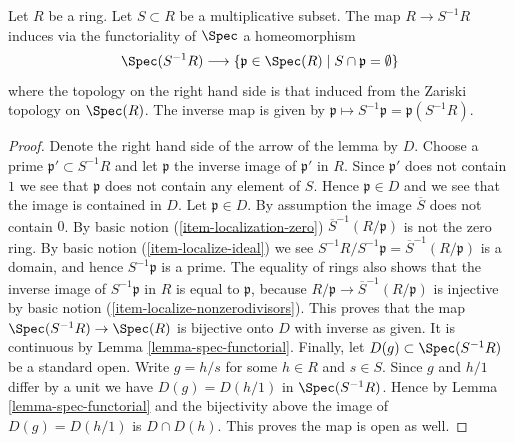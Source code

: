 \begin{lemma}
\label{lemma-spec-localization}
Let $R$ be a ring. Let $S \subset R$ be a multiplicative subset.
The map $R \to S^{-1}R$ induces via the functoriality of $\Spec$
a homeomorphism
$$
\Spec(S^{-1}R)
\longrightarrow
\{\mathfrak p \in \Spec(R) \mid S \cap \mathfrak p = \emptyset \}
$$
where the topology on the right hand side is that induced from the
Zariski topology on $\Spec(R)$. The inverse map is given
by $\mathfrak p \mapsto S^{-1}\mathfrak p = \mathfrak p(S^{-1}R)$.
\end{lemma}

\begin{proof}
Denote the right hand side of the arrow of the lemma by $D$.
Choose a prime $\mathfrak p' \subset S^{-1}R$ and let $\mathfrak p$
the inverse image of $\mathfrak p'$ in $R$. Since $\mathfrak p'$
does not contain $1$ we see that $\mathfrak p$ does not contain
any element of $S$. Hence $\mathfrak p \in D$ and we see that
the image is contained in $D$. Let $\mathfrak p \in D$.
By assumption the image $\overline{S}$ does not contain $0$.
By basic notion (\ref{item-localization-zero})
$\overline{S}^{-1}(R/\mathfrak p)$ is not the zero ring.
By basic notion (\ref{item-localize-ideal}) we see
$S^{-1}R / S^{-1}\mathfrak p = \overline{S}^{-1}(R/\mathfrak p)$
is a domain, and hence $S^{-1}\mathfrak p$ is a prime.
The equality of rings also shows that the inverse image of
$S^{-1}\mathfrak p$ in $R$ is equal to $\mathfrak p$,
because $R/\mathfrak p \to \overline{S}^{-1}(R/\mathfrak p)$
is injective by basic notion (\ref{item-localize-nonzerodivisors}).
This proves that the map $\Spec(S^{-1}R) \to \Spec(R)$
is bijective onto $D$ with inverse as given.
It is continuous by Lemma \ref{lemma-spec-functorial}.
Finally, let $D(g) \subset \Spec(S^{-1}R)$ be a standard
open. Write $g = h/s$ for some $h\in R$ and $s\in S$.
Since $g$ and $h/1$ differ by a unit we have $D(g) =
D(h/1)$ in $\Spec(S^{-1}R)$.
Hence by Lemma \ref{lemma-spec-functorial} and the bijectivity
above the image of $D(g) = D(h/1)$ is $D \cap D(h)$.
This proves the map is open as well.
\end{proof}